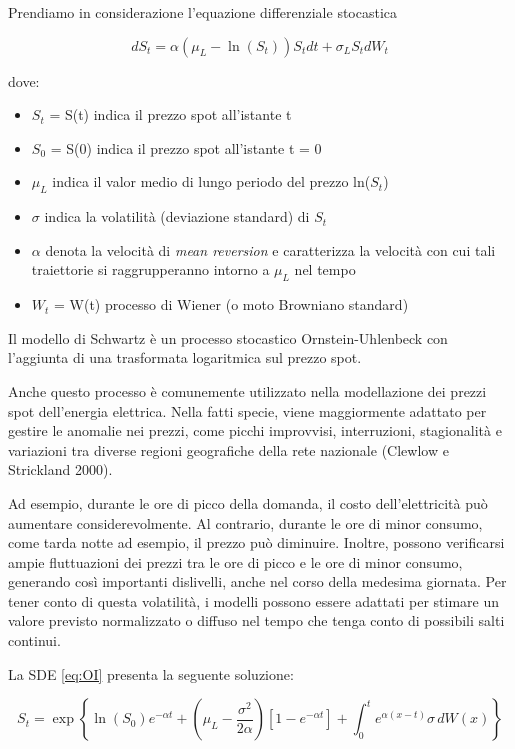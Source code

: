 \documentclass[12pt,a4paper]{report}
\begin{document}
Prendiamo in considerazione l'equazione differenziale stocastica

\begin{equation}
    dS_t = \alpha (\mu_L - \ln(S_t)) S_t dt + \sigma_L S_t dW_{t} \label{eq:OI}
\end{equation}

dove:
\begin{itemize}
    \item $S_t$ = S(t) indica il prezzo spot all'istante t
    \item $S_0$ = S(0) indica il prezzo spot all'istante t = 0
    \item $\mu_L$ indica il valor medio di lungo periodo del prezzo ln($S_t$)
    \item $\sigma$ indica la volatilità (deviazione standard) di $S_t$
    \item $\alpha$ denota la velocità di \textit{mean reversion} e caratterizza la velocità con cui tali traiettorie si raggrupperanno intorno a $\mu_L$ nel tempo
    \item $W_t$ = W(t) processo di Wiener (o moto Browniano standard)
\end{itemize}



Il modello di Schwartz è un processo stocastico Ornstein-Uhlenbeck con l'aggiunta di una trasformata logaritmica sul prezzo spot. 

Anche questo processo è comunemente utilizzato nella modellazione dei prezzi spot dell'energia elettrica. Nella fatti specie, viene maggiormente adattato per gestire le anomalie nei prezzi, come picchi improvvisi, interruzioni, stagionalità e variazioni tra diverse regioni geografiche della rete nazionale (Clewlow e Strickland 2000).

Ad esempio, durante le ore di picco della domanda, il costo dell'elettricità può aumentare considerevolmente. Al contrario, durante le ore di minor consumo, come tarda notte ad esempio, il prezzo può diminuire. Inoltre, possono verificarsi ampie fluttuazioni dei prezzi tra le ore di picco e le ore di minor consumo, generando così importanti dislivelli, anche nel corso della medesima giornata. Per tener conto di questa volatilità, i modelli possono essere adattati per stimare un valore previsto normalizzato o diffuso nel tempo che tenga conto di possibili salti continui.

La SDE \eqref{eq:OI} presenta la seguente soluzione:

\begin{equation}
S_t = \exp \left\{\ln(S_0) e^{-\alpha t} + \left(\mu_L - \frac{\sigma^2}{2\alpha}\right) \left[1 -  e^{-\alpha t}\right] + \int_{0}^{t} e^{\alpha (x-t)} \sigma \, dW(x)\right\}
\end{equation}
\end{document}
